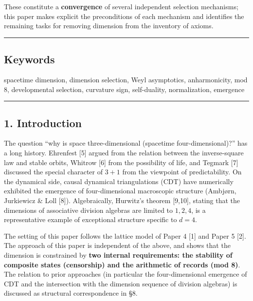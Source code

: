 \documentclass[
]{ltjsarticle}
\begin{document}
These constitute a \textbf{convergence} of several independent selection
mechanisms; this paper makes explicit the preconditions of each
mechanism and identifies the remaining tasks for removing dimension from
the inventory of axioms.

\begin{center}\rule{0.5\linewidth}{0.5pt}\end{center}

\subsection{Keywords}\label{keywords}

spacetime dimension, dimension selection, Weyl asymptotics,
anharmonicity, mod 8, developmental selection, curvature sign,
self-duality, normalization, emergence

\begin{center}\rule{0.5\linewidth}{0.5pt}\end{center}

\subsection{1. Introduction}\label{introduction}

The question ``why is space three-dimensional (spacetime
four-dimensional)?'' has a long history. Ehrenfest {[}5{]} argued from
the relation between the inverse-square law and stable orbits, Whitrow
{[}6{]} from the possibility of life, and Tegmark {[}7{]} discussed the
special character of \(3{+}1\) from the viewpoint of predictability. On
the dynamical side, causal dynamical triangulations (CDT) have
numerically exhibited the emergence of four-dimensional macroscopic
structure (Ambjørn, Jurkiewicz \& Loll {[}8{]}). Algebraically,
Hurwitz's theorem {[}9,10{]}, stating that the dimensions of associative
division algebras are limited to \(1,2,4\), is a representative example
of exceptional structure specific to \(d=4\).

The setting of this paper follows the lattice model of Paper 4 {[}1{]}
and Paper 5 {[}2{]}. The approach of this paper is independent of the
above, and shows that the dimension is constrained by \textbf{two
internal requirements: the stability of composite states (censorship)
and the arithmetic of records (mod 8)}. The relation to prior approaches
(in particular the four-dimensional emergence of CDT and the
intersection with the dimension sequence of division algebras) is
discussed as structural correspondence in §8.
\end{document}
